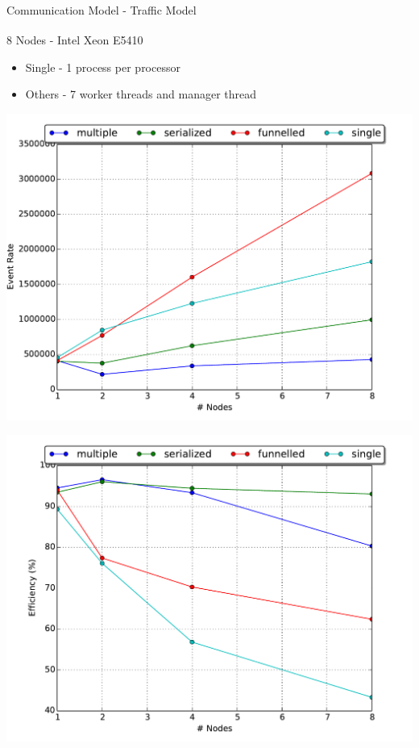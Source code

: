 \documentclass[10pt]{beamer}
\begin{document}
\begin{frame}{Communication Model - Traffic Model}
    \begin{block}{8 Nodes - Intel\textsuperscript{\textregistered} Xeon\textsuperscript{\textregistered} E5410}
        \begin{itemize}
            \item Single - 1 process per processor
            \item Others - 7 worker threads and manager thread
        \end{itemize}
        \begin{minipage}{0.5\textwidth}
            \includegraphics[width=\textwidth]{../figs/partitioning_communication/communication_traffic_eventrate.pdf}
        \end{minipage}%
        \begin{minipage}{0.5\textwidth}
            \includegraphics[width=\textwidth]{../figs/partitioning_communication/communication_traffic_efficiency.pdf}

\end{minipage}
\end{block}
\end{frame}
\end{document}
